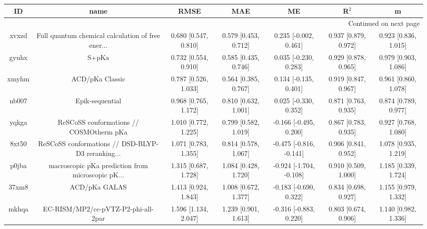\documentclass{article}
\begin{document}
\begin{center}
\begin{longtable}{|ccccccc|}
\toprule
    ID &                                               name &                  RMSE &                   MAE &                       ME &                 R$^2$ &                      m \\
\midrule
\endhead
\midrule
\multicolumn{7}{r}{{Continued on next page}} \\
\midrule
\endfoot

\bottomrule
\endlastfoot
 xvxzd &  Full quantum chemical calculation of free ener... &  0.680 [0.547, 0.810] &  0.579 [0.453, 0.712] &    0.235 [-0.002, 0.461] &  0.937 [0.879, 0.972] &   0.923 [0.836, 1.015] \\
 gyuhx &                                              S+pKa &  0.732 [0.554, 0.910] &  0.585 [0.435, 0.746] &    0.035 [-0.230, 0.283] &  0.929 [0.878, 0.965] &   0.979 [0.903, 1.086] \\
 xmyhm &                                    ACD/pKa Classic &  0.787 [0.526, 1.033] &  0.564 [0.385, 0.767] &    0.134 [-0.135, 0.401] &  0.919 [0.847, 0.967] &   0.961 [0.860, 1.078] \\
 nb007 &                                    Epik-sequential &  0.968 [0.765, 1.172] &  0.810 [0.632, 1.001] &    0.025 [-0.330, 0.352] &  0.871 [0.763, 0.935] &   0.874 [0.789, 0.977] \\
 yqkga &            ReSCoSS conformations // COSMOtherm pKa &  1.010 [0.772, 1.225] &  0.799 [0.582, 1.019] &   -0.166 [-0.495, 0.200] &  0.867 [0.783, 0.935] &   0.927 [0.768, 1.080] \\
 8xt50 &  ReSCoSS conformations // DSD-BLYP-D3 reranking... &  1.071 [0.783, 1.355] &  0.814 [0.578, 1.067] &  -0.475 [-0.816, -0.141] &  0.906 [0.841, 0.952] &   1.078 [0.935, 1.219] \\
 p0jba &  macroscopic pKa prediction from microscopic pK... &  1.315 [0.687, 1.728] &  1.084 [0.428, 1.720] &  -0.924 [-1.704, -0.108] &  0.910 [0.509, 1.000] &   1.185 [0.339, 1.724] \\
 37xm8 &                                      ACD/pKa GALAS &  1.413 [0.924, 1.843] &  1.008 [0.672, 1.377] &   -0.183 [-0.690, 0.322] &  0.834 [0.698, 0.927] &   1.155 [0.979, 1.332] \\
 mkhqa &                EC-RISM/MP2/cc-pVTZ-P2-phi-all-2par &  1.596 [1.134, 2.047] &  1.239 [0.901, 1.613] &   -0.316 [-0.883, 0.220] &  0.803 [0.674, 0.906] &   1.140 [0.982, 1.336] \\

\end{longtable}
\end{center}
\end{document}
